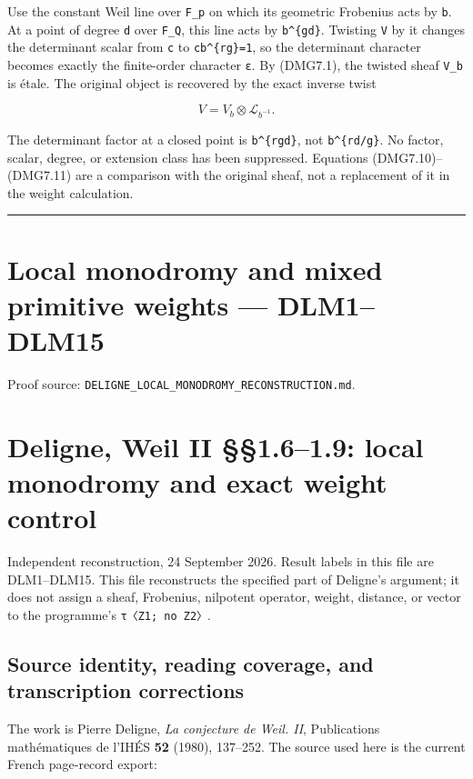 \documentclass[
]{report}
\begin{document}
Use the constant Weil line over \texttt{F\_p} on which its geometric
Frobenius acts by \texttt{b}. At a point of degree \texttt{d} over
\texttt{F\_Q}, this line acts by \texttt{b\^{}\{gd\}}. Twisting
\texttt{V} by it changes the determinant scalar from \texttt{c} to
\texttt{cb\^{}\{rg\}=1}, so the determinant character becomes exactly
the finite-order character \texttt{ε}. By (DMG7.1), the twisted sheaf
\texttt{V\_b} is étale. The original object is recovered by the exact
inverse twist

\[
V=V_b\otimes\mathcal L_{b^{-1}}.
\tag{DMG7.11}
\]

The determinant factor at a closed point is \texttt{b\^{}\{rgd\}}, not
\texttt{b\^{}\{rd/g\}}. No factor, scalar, degree, or extension class
has been suppressed. Equations (DMG7.10)--(DMG7.11) are a comparison
with the original sheaf, not a replacement of it in the weight
calculation.

\begin{center}\rule{0.5\linewidth}{0.5pt}\end{center}

\chapter{Local monodromy and mixed primitive weights ---
DLM1--DLM15}\label{local-monodromy-and-mixed-primitive-weights-dlm1dlm15}

Proof source: \nolinkurl{DELIGNE_LOCAL_MONODROMY_RECONSTRUCTION.md}.

\chapter{Deligne, Weil II §§1.6--1.9: local monodromy and exact weight
control}\label{deligne-weil-ii-1.61.9-local-monodromy-and-exact-weight-control}

Independent reconstruction, 24 September 2026. Result labels in this
file are DLM1--DLM15. This file reconstructs the specified part of
Deligne's argument; it does not assign a sheaf, Frobenius, nilpotent
operator, weight, distance, or vector to the programme's
\texttt{τ〈Z1;\ no\ Z2〉}.

\section{Source identity, reading coverage, and transcription
corrections}\label{source-identity-reading-coverage-and-transcription-corrections}

The work is Pierre Deligne, \emph{La conjecture de Weil. II},
Publications mathématiques de l'IHÉS \textbf{52} (1980), 137--252. The
source used here is the current French page-record export:
\end{document}
